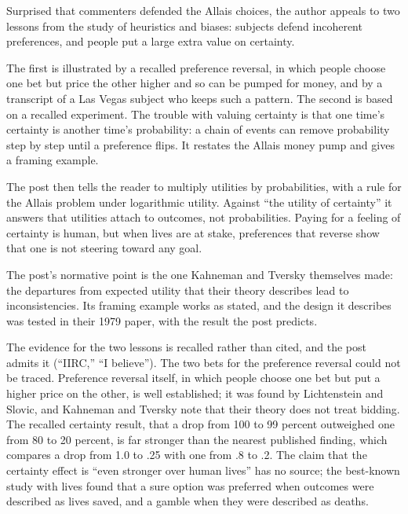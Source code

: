 \begin{afterword}
\summaryhead

Surprised that commenters defended the Allais choices, the author appeals to two lessons from the study of heuristics and biases: subjects defend incoherent preferences, and people put a large extra value on certainty.

The first is illustrated by a recalled preference reversal, in which people choose one bet but price the other higher and so can be pumped for money, and by a transcript of a Las Vegas subject who keeps such a pattern. The second is based on a recalled experiment. The trouble with valuing certainty is that one time's certainty is another time's probability: a chain of events can remove probability step by step until a preference flips. It restates the Allais money pump and gives a framing example.

The post then tells the reader to multiply utilities by probabilities, with a rule for the Allais problem under logarithmic utility. Against ``the utility of certainty'' it answers that utilities attach to outcomes, not probabilities. Paying for a feeling of certainty is human, but when lives are at stake, preferences that reverse show that one is not steering toward any goal.

\responsehead

The post's normative point is the one Kahneman and Tversky themselves made: the departures from expected utility that their theory describes lead to inconsistencies. Its framing example works as stated, and the design it describes was tested in their 1979 paper, with the result the post predicts.

The evidence for the two lessons is recalled rather than cited, and the post admits it (``IIRC,'' ``I believe''). The two bets for the preference reversal could not be traced. Preference reversal itself, in which people choose one bet but put a higher price on the other, is well established; it was found by Lichtenstein and Slovic, and Kahneman and Tversky note that their theory does not treat bidding. The recalled certainty result, that a drop from 100 to 99 percent outweighed one from 80 to 20 percent, is far stronger than the nearest published finding, which compares a drop from 1.0 to .25 with one from .8 to .2. The claim that the certainty effect is ``even stronger over human lives'' has no source; the best-known study with lives found that a sure option was preferred when outcomes were described as lives saved, and a gamble when they were described as deaths.


\end{afterword}
